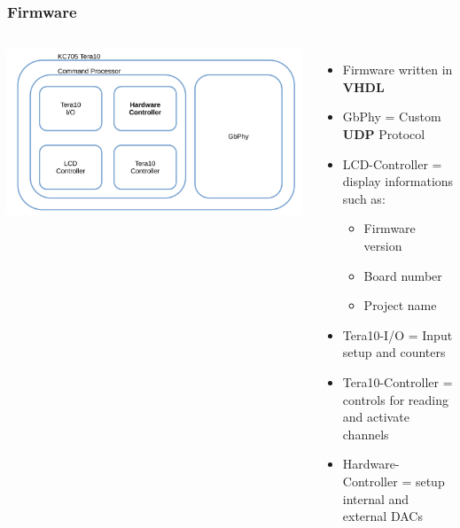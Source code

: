\documentclass[aspectratio=169]{beamer}
\begin{document}
	\begin{frame}
		\frametitle{Firmware}
		\begin{columns}
			\begin{center}
				\includegraphics[width=1.0 \textwidth]{IMG/Tera10kc705.pdf}
			\end{center}
			\begin{itemize}
				\item Firmware written in \textbf{VHDL}
				\item GbPhy = Custom \textbf{UDP} Protocol
				\item LCD-Controller = display informations such as:
					\begin{itemize}
						\item Firmware version
						\item Board number
						\item Project name
					\end{itemize}
				\item Tera10-I/O = Input setup and counters
				\item Tera10-Controller = controls for reading and activate channels
				\item Hardware-Controller = setup internal and external DACs
			\end{itemize}
		\end{columns}
	\end{frame}
\end{document}

